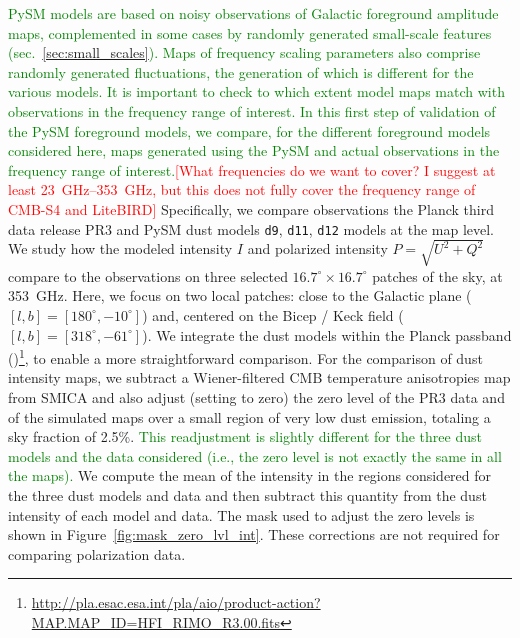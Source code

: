 \documentclass[twocolumn]{aastex631}
\newcommand{\dnine}{{\tt d9}}
\newcommand{\jd}[1]{\textcolor{green}{#1}}
\begin{document}
\jd{PySM models are based on noisy observations of Galactic foreground amplitude maps, complemented in some cases by randomly generated small-scale features (sec.~\ref{sec:small_scales}). Maps of frequency scaling parameters also comprise randomly generated fluctuations, the generation of which is different for the various models. It is important to check to which extent model maps match with observations in the frequency range of interest. In this first step of validation of the PySM foreground models, we compare, for the different foreground models considered here, maps generated using the PySM and actual observations in the frequency range of interest.}\textcolor{red}{[What frequencies do we want to cover? I suggest at least 23~GHz--353~GHz, but this does not fully cover the frequency range of CMB-S4 and LiteBIRD]}
Specifically, we compare observations the Planck third data release PR3 \cite{planck2016-l03} and PySM dust models \dnine{}, {\tt d11}, {\tt d12} models at the map level. We study how the modeled intensity $I$ and polarized intensity $P = \sqrt{U^2 + Q^2}$ compare to the observations on three selected $16.7^\circ \times 16.7^\circ$ patches of the sky, at 353~GHz. Here, we focus on two local patches: close to the Galactic plane ($[l,b] =[180^\circ,-10^\circ]$) and, centered on the Bicep / Keck field ($[l,b] =[318^\circ,-61^\circ]$).
We integrate the dust models within the Planck passband (\cite{planck2013-p03d})\footnote{\url{http://pla.esac.esa.int/pla/aio/product-action?MAP.MAP_ID=HFI_RIMO_R3.00.fits}}, to enable a more straightforward comparison. For the comparison of dust intensity maps, we subtract a Wiener-filtered CMB temperature anisotropies map from SMICA and also adjust (setting to zero) the zero level of the PR3 data and of the simulated maps over a small region of very low dust emission, totaling a sky fraction of 2.5\%.
\jd{This readjustment is slightly different for the three dust models and the data considered (i.e., the zero level is not exactly the same in all the maps).} We compute the mean of the intensity in the regions considered for the three dust models and data and then subtract this quantity from the dust intensity of each model and data. The mask used to adjust the zero levels is shown in Figure~\ref{fig:mask_zero_lvl_int}. 
These corrections are not required for comparing polarization data. 
\end{document}
